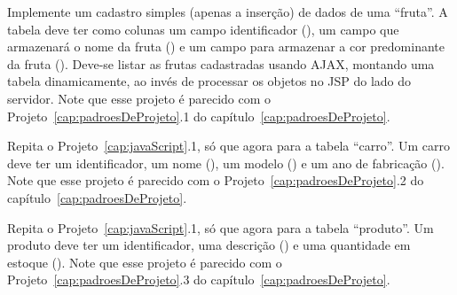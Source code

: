 \begin{projetoSemArquivo}{}{}{}
    Implemente um cadastro simples (apenas a inserção) de dados de uma ``fruta''. A tabela deve ter como colunas um campo identificador (), um campo que armazenará o nome da fruta () e um campo para armazenar a cor predominante da fruta (). Deve-se listar as frutas cadastradas usando AJAX, montando uma tabela dinamicamente, ao invés de processar os objetos no JSP do lado do servidor. Note que esse projeto é parecido com o Projeto~\ref{cap:padroesDeProjeto}.1 do capítulo~\ref{cap:padroesDeProjeto}.
\end{projetoSemArquivo}

\begin{projetoSemArquivo}{}{}{}
    Repita o Projeto~\ref{cap:javaScript}.1, só que agora para a tabela ``carro''. Um carro deve ter um identificador, um nome (), um modelo () e um ano de fabricação (). Note que esse projeto é parecido com o Projeto~\ref{cap:padroesDeProjeto}.2 do capítulo~\ref{cap:padroesDeProjeto}.
\end{projetoSemArquivo}

\begin{projetoSemArquivo}{}{}{}
    Repita o Projeto~\ref{cap:javaScript}.1, só que agora para a tabela ``produto''. Um produto deve ter um identificador, uma descrição () e uma quantidade em estoque (). Note que esse projeto é parecido com o Projeto~\ref{cap:padroesDeProjeto}.3 do capítulo~\ref{cap:padroesDeProjeto}.
\end{projetoSemArquivo}